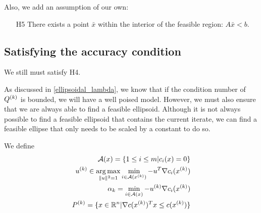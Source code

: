 Also, we add an assumption of our own:
\begin{itemize}
\item[H5] There exists a point $\bar x$ within the interior of the feasible region: $A\bar x < b$.
\end{itemize}


\subsection{Satisfying the accuracy condition}
We still must satisfy H4.

As discussed in \cref{ellipsoidal_lambda}, we know that if the condition number of ${Q^{(k)}}$ is bounded, we will have a well poised model.
However, we must also ensure that we are always able to find a feasible ellipsoid.
Although it is not always possible to find a feasible ellipsoid that contains the current iterate,
we can find a feasible ellipse that only needs to be scaled by a constant to do so.



We define
\begin{align}
\mathcal A(x) = \{1 \le i \le m | c_i(x) = 0 \} \label{active_indices} \\
u^{(k)} \in \operatorname*{arg\,max}_{\|u\|^2 = 1} \min_{i \in \mathcal A({x^{(k)}})} - u^T \nabla c_i({x^{(k)}}) \label{define_feasible_direction}\\
\alpha_k = \min_{i \in \mathcal A(x)} -u^{(k)}\nabla c_i({x^{(k)}}) \\
P^{(k)} = \{x \in \mathbb R^n | \nabla c({x^{(k)}})^T x \le c({x^{(k)}}) \}
\end{align}


